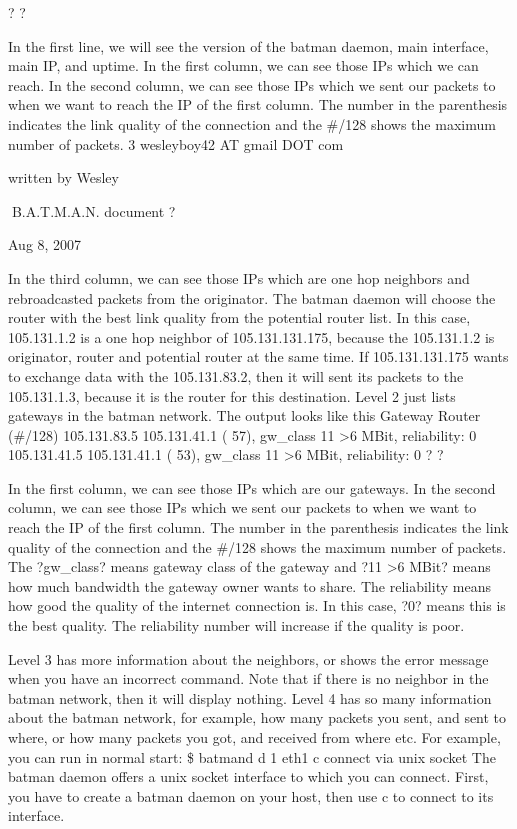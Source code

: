 \documentclass[
	12pt,
	a4paper,
	twoside,
	english,
	headsepline,
	footnosepline,
	automark,
	normalheadings,
	openany,
	cleardoubleplain,
	abstracton,
	idxtotoc,
	liststotoc,
	bibtotoc,
 	BCOR8mm,
]{scrartcl}
\begin{document}
? ?

In the first line, we will see the version of the batman daemon, main interface, main  IP, and uptime. In the first column, we can see those IPs  which we can reach. In the second column, we can see those IPs which we sent our packets to when we  want to reach the IP of the first column. The number in the parenthesis indicates the  link quality of the connection and the \#/128 shows the maximum number of packets. 3 wesleyboy42 AT gmail DOT com

written by Wesley

B.A.T.M.A.N. document
?

Aug 8, 2007

In the third column, we can see those IPs which are one hop neighbors and  rebroadcasted packets from the originator. The batman daemon will choose the router  with the best link quality from the potential router list.  In this case, 105.131.1.2 is a one hop neighbor of 105.131.131.175, because the 105.131.1.2  is  originator, router and potential router at the same time. If 105.131.131.175 wants to exchange  data with the 105.131.83.2, then it will sent its packets to the 105.131.1.3, because it is the  router for this destination. Level 2 just lists gateways in the batman network. The output looks like this Gateway              Router (\#/128)   105.131.83.5       105.131.41.1 ( 57), gw\_class 11   >6 MBit, reliability: 0   105.131.41.5       105.131.41.1 ( 53), gw\_class 11   >6 MBit, reliability: 0
? ?

In the first column, we can see those IPs  which are our gateways. In the second column, we can see those IPs which we sent our packets to when we  want to reach the IP of the first column. The number in the parenthesis indicates the  link quality of the connection and the \#/128 shows the maximum number of packets.  The ?gw\_class? means gateway class of the gateway and ?11  >6 MBit? means how  much bandwidth the gateway owner wants to share. The reliability means how good  the quality of the internet connection is. In this case, ?0? means this is the best  quality. The reliability number will increase if the quality is poor.

Level 3 has more information about the neighbors, or shows the error message when  you  have an incorrect command. Note that if there is no neighbor in the batman network, then it  will display nothing. Level 4 has so many information about the batman network, for example, how many packets  you sent, and sent to where, or how many packets you got, and received from where etc.  For example, you can run in normal start: \$ batmand  d 1 eth1  c connect via unix socket The batman daemon offers a unix socket interface to which you can connect. First, you have to create a batman daemon on your host, then use  c to connect to its  interface.
\end{document}
